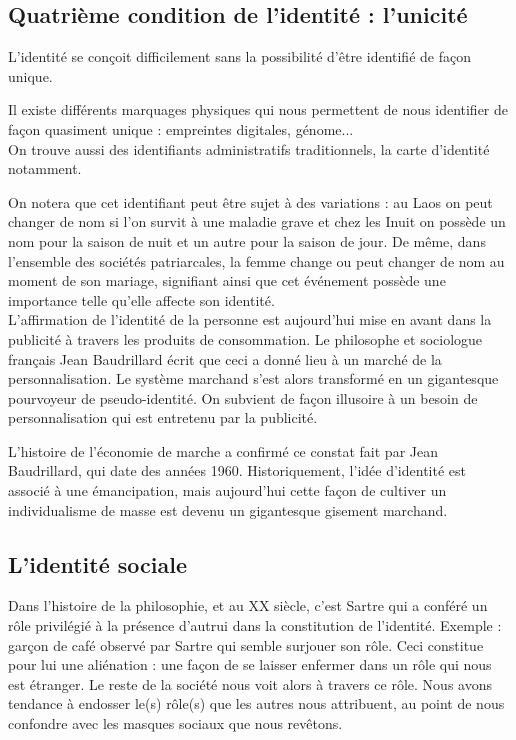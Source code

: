 \subsection{Quatrième condition de l'identité : l'unicité}
	L'identité se conçoit difficilement sans la possibilité d'être identifié de façon unique.

	Il existe différents marquages physiques qui nous permettent de nous identifier de façon quasiment unique : empreintes digitales, génome...\\

	On trouve aussi des identifiants administratifs traditionnels, la carte d'identité notamment.

	On notera que cet identifiant peut être sujet à des variations : au Laos on peut changer de nom si l'on survit à une maladie grave et chez les Inuit on possède un nom pour la saison de nuit et un autre pour la saison de jour.
	De même, dans l'ensemble des sociétés patriarcales, la femme change ou peut changer de nom au moment de son mariage, signifiant ainsi que cet événement possède une importance telle qu'elle affecte son identité.\\

	L'affirmation de l'identité de la personne est aujourd'hui mise en avant dans la publicité à travers les produits de consommation.
	Le philosophe et sociologue français Jean Baudrillard écrit que ceci a donné lieu à un marché de la personnalisation.
	Le système marchand s'est alors transformé en un gigantesque pourvoyeur de pseudo-identité.
	On subvient de façon illusoire à un besoin de personnalisation qui est entretenu par la publicité.

	L'histoire de l'économie de marche a confirmé ce constat fait par Jean Baudrillard, qui date des années 1960.
	Historiquement, l'idée d'identité est associé à une émancipation, mais aujourd'hui cette façon de cultiver un individualisme de masse est devenu un gigantesque gisement marchand.\\

\subsection{L'identité sociale}
	Dans l'histoire de la philosophie, et au XX siècle, c'est Sartre qui a conféré un rôle privilégié à la présence d'autrui dans la constitution de l'identité.
	Exemple : garçon de café observé par Sartre qui semble surjouer son rôle.
	Ceci constitue pour lui une aliénation : une façon de se laisser enfermer dans un rôle qui nous est étranger.
	Le reste de la société nous voit alors à travers ce rôle.
	Nous avons tendance à endosser le(s) rôle(s) que les autres nous attribuent, au point de nous confondre avec les masques sociaux que nous revêtons.

